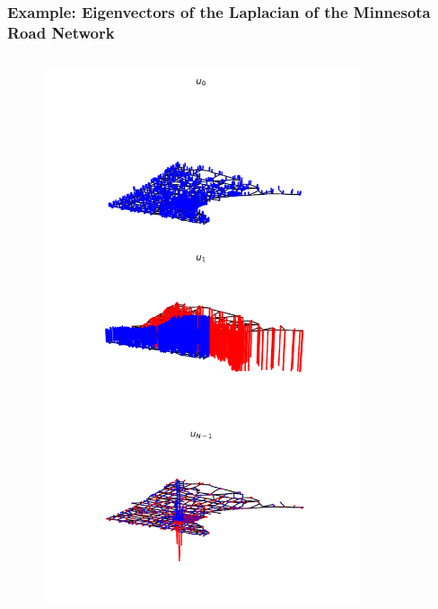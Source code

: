 \documentclass{beamer}
\begin{document}
\begin{frame}
  \frametitle{Example: Eigenvectors of the Laplacian of the Minnesota Road Network}
  \begin{columns}
    \begin{column}{0.5\textwidth}
\begin{figure}
\includegraphics[trim={0 10cm 0 0},clip,width=\linewidth]{../img/graph_fourier_transform_5.pdf}
\end{figure}
  \end{column}
    \begin{column}{0.5\textwidth}
\begin{figure}

\end{figure}
\end{column}
\end{columns}
\end{frame}
\end{document}
